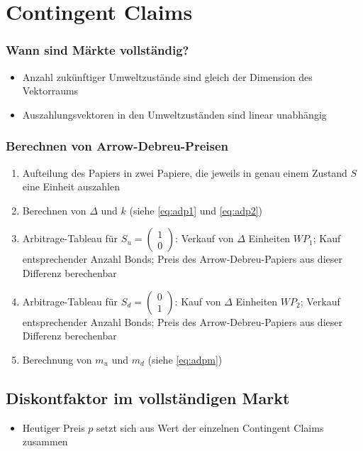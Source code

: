 \section{Contingent Claims}

\subsubsection{Wann sind Märkte vollständig?}
\begin{itemize}
	\item Anzahl zukünftiger Umweltzustände sind gleich der Dimension des Vektorraums
	\item Auszahlungsvektoren in den Umweltzuständen sind linear unabhängig
\end{itemize}

\subsubsection{Berechnen von Arrow-Debreu-Preisen}
\begin{enumerate}
	\item Aufteilung des Papiers in zwei Papiere, die jeweils in genau einem Zustand \(S\) eine Einheit auszahlen
	\item Berechnen von \(\Delta\) und \(k\) (siehe \ref{eq:adp1} und \ref{eq:adp2})
	\item Arbitrage-Tableau für \(S_u = \begin{pmatrix} 1 \\ 0 \end{pmatrix}\): Verkauf von \(\Delta\) Einheiten \(WP_1\); Kauf entsprechender Anzahl Bonds; Preis des Arrow-Debreu-Papiers aus dieser Differenz berechenbar
	\item Arbitrage-Tableau für \(S_d = \begin{pmatrix} 0 \\ 1 \end{pmatrix}\): Kauf von \(\Delta\) Einheiten \(WP_2\); Verkauf entsprechender Anzahl Bonds; Preis des Arrow-Debreu-Papiers aus dieser Differenz berechenbar
	\item Berechnung von \(m_u\) und \(m_d\) (siehe \ref{eq:adpm})
\end{enumerate}


\subsection{Diskontfaktor im vollständigen Markt}
\begin{itemize}
	\item Heutiger Preis \(p\) setzt sich aus Wert der einzelnen Contingent Claims zusammen
\end{itemize}


